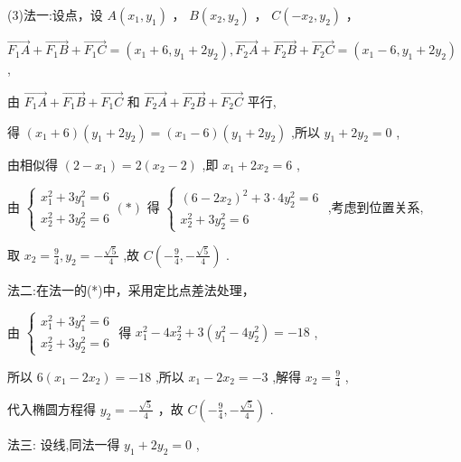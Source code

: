 \documentclass[10pt]{article}
\begin{document}
(3)法一:设点，设 \(A\left( {{x}_{1},{y}_{1}}\right)\) ， \(B\left( {{x}_{2},{y}_{2}}\right)\) ， \(C\left( {-{x}_{2},{y}_{2}}\right)\) ，

\(\overrightarrow{{F}_{1}A} + \overrightarrow{{F}_{1}B} + \overrightarrow{{F}_{1}C} = \left( {{x}_{1} + 6,{y}_{1} + 2{y}_{2}}\right) ,\overrightarrow{{F}_{2}A} + \overrightarrow{{F}_{2}B} + \overrightarrow{{F}_{2}C} = \left( {{x}_{1} - 6,{y}_{1} + 2{y}_{2}}\right)\) ,

由 \(\overrightarrow{{F}_{1}A} + \overrightarrow{{F}_{1}B} + \overrightarrow{{F}_{1}C}\) 和 \(\overrightarrow{{F}_{2}A} + \overrightarrow{{F}_{2}B} + \overrightarrow{{F}_{2}C}\) 平行,

得 \(\left( {{x}_{1} + 6}\right) \left( {{y}_{1} + 2{y}_{2}}\right)  = \left( {{x}_{1} - 6}\right) \left( {{y}_{1} + 2{y}_{2}}\right)\) ,所以 \({y}_{1} + 2{y}_{2} = 0\) ,

由相似得 \(\left( {2 - {x}_{1}}\right)  = 2\left( {{x}_{2} - 2}\right)\) ,即 \({x}_{1} + 2{x}_{2} = 6\) ,

由 \(\left\{  \begin{array}{l} {x}_{1}^{2} + 3{y}_{1}^{2} = 6 \\  {x}_{2}^{2} + 3{y}_{2}^{2} = 6 \end{array}\right. \left( *\right)\) 得 \(\left\{  \begin{array}{l} {\left( 6 - 2{x}_{2}\right) }^{2} + 3 \cdot  4{y}_{2}^{2} = 6 \\  {x}_{2}^{2} + 3{y}_{2}^{2} = 6 \end{array}\right.\) ,考虑到位置关系,

取 \({x}_{2} = \frac{9}{4},{y}_{2} =  - \frac{\sqrt{5}}{4}\) ,故 \(C\left( {-\frac{9}{4}, - \frac{\sqrt{5}}{4}}\right)\) .

法二:在法一的(*)中，采用定比点差法处理，

由 \(\left\{  \begin{array}{l} {x}_{1}^{2} + 3{y}_{1}^{2} = 6 \\  {x}_{2}^{2} + 3{y}_{2}^{2} = 6 \end{array}\right.\) 得 \({x}_{1}^{2} - 4{x}_{2}^{2} + 3\left( {{y}_{1}^{2} - 4{y}_{2}^{2}}\right)  =  - {18}\) ,

所以 \(6\left( {{x}_{1} - 2{x}_{2}}\right)  =  - {18}\) ,所以 \({x}_{1} - 2{x}_{2} =  - 3\) ,解得 \({x}_{2} = \frac{9}{4}\) ,

代入椭圆方程得 \({y}_{2} =  - \frac{\sqrt{5}}{4}\) ，故 \(C\left( {-\frac{9}{4}, - \frac{\sqrt{5}}{4}}\right)\) .

法三: 设线,同法一得 \({y}_{1} + 2{y}_{2} = 0\) ,
\end{document}
